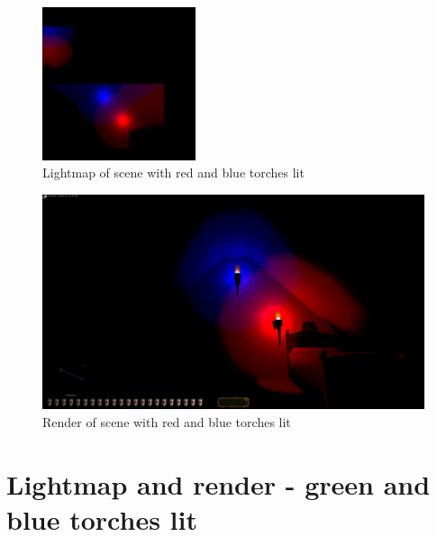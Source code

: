 \begin{appendix}
\begin{figure}[htbp]
	\centering
		\includegraphics[width=0.40\textwidth]{img/PIX/rb.png}
	\caption[Lightmap of scene with red and blue torches lit]{Lightmap of scene with red and blue torches lit}
	\label{fig:LightmapRB}
\end{figure}
\begin{figure}[htbp]
	\centering
		\includegraphics[width=1.00\textwidth]{img/PIX/render_rb.png}
	\caption[Render of scene with red and blue torches lit]{Render of scene with red and blue torches lit}
	\label{fig:RenderRB}
\end{figure}

\clearpage
{}
\section{Lightmap and render - green and blue torches lit} 



\end{appendix}

